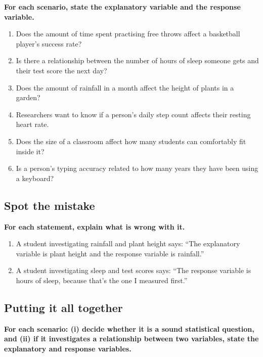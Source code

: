 \documentclass[11pt]{article}
\newcommand{\ans}{\hrulefill}
\newcommand{\anshere}{\par\vspace{0.4em}\noindent\ans\par\vspace{0.4em}}
\begin{document}
\vspace{0.4em}
\noindent\textbf{For each scenario, state the explanatory variable and the response variable.}
\begin{enumerate}[label=(\alph*)]
  \item Does the amount of time spent practising free throws affect a basketball player's
    success rate?
  \anshere
  \item Is there a relationship between the number of hours of sleep someone gets and their
    test score the next day?
  \anshere
  \item Does the amount of rainfall in a month affect the height of plants in a garden?
  \anshere
  \item Researchers want to know if a person's daily step count affects their resting heart
    rate.
  \anshere
  \item Does the size of a classroom affect how many students can comfortably fit inside it?
  \anshere
  \item Is a person's typing accuracy related to how many years they have been using a
    keyboard?
  \anshere
\end{enumerate}

\newpage

\subsection*{Spot the mistake}
\noindent\textbf{For each statement, explain what is wrong with it.}
\begin{enumerate}[label=(\alph*)]
  \item A student investigating rainfall and plant height says: ``The explanatory variable is
    plant height and the response variable is rainfall.''
  \anshere
  \item A student investigating sleep and test scores says: ``The response variable is hours of
    sleep, because that's the one I measured first.''
  \anshere
\end{enumerate}

\vspace{0.5em}
\subsection*{Putting it all together}
\noindent\textbf{For each scenario: (i) decide whether it is a sound statistical question, and
(ii) if it investigates a relationship between two variables, state the explanatory and response
variables.}
\end{document}
